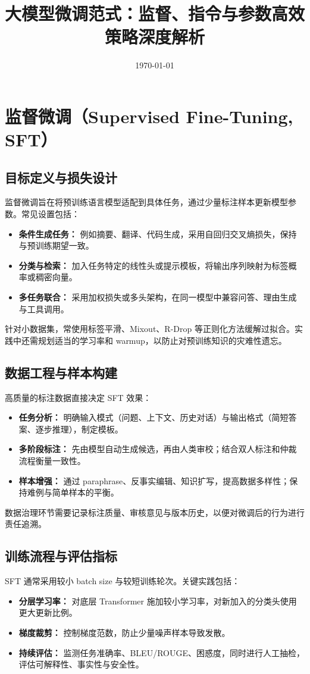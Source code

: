 \documentclass[UTF8,zihao=-4]{ctexart}
\title{大模型微调范式：监督、指令与参数高效策略深度解析}
\author{}
\date{\today}
\begin{document}
\maketitle

\section{监督微调（Supervised Fine-Tuning, SFT）}
\subsection{目标定义与损失设计}
监督微调旨在将预训练语言模型适配到具体任务，通过少量标注样本更新模型参数。常见设置包括：
\begin{itemize}
  \item \textbf{条件生成任务：} 例如摘要、翻译、代码生成，采用自回归交叉熵损失，保持与预训练期望一致。
  \item \textbf{分类与检索：} 加入任务特定的线性头或提示模板，将输出序列映射为标签概率或稠密向量。
  \item \textbf{多任务联合：} 采用加权损失或多头架构，在同一模型中兼容问答、理由生成与工具调用。
\end{itemize}
针对小数据集，常使用标签平滑、Mixout、R-Drop 等正则化方法缓解过拟合。实践中还需规划适当的学习率和 warmup，以防止对预训练知识的灾难性遗忘。

\subsection{数据工程与样本构建}
高质量的标注数据直接决定 SFT 效果：
\begin{itemize}
  \item \textbf{任务分析：} 明确输入模式（问题、上下文、历史对话）与输出格式（简短答案、逐步推理），制定模板。
  \item \textbf{多阶段标注：} 先由模型自动生成候选，再由人类审校；结合双人标注和仲裁流程衡量一致性。
  \item \textbf{样本增强：} 通过 paraphrase、反事实编辑、知识扩写，提高数据多样性；保持难例与简单样本的平衡。
\end{itemize}
数据治理环节需要记录标注质量、审核意见与版本历史，以便对微调后的行为进行责任追溯。

\subsection{训练流程与评估指标}
SFT 通常采用较小 batch size 与较短训练轮次。关键实践包括：
\begin{itemize}
  \item \textbf{分层学习率：} 对底层 Transformer 施加较小学习率，对新加入的分类头使用更大更新比例。
  \item \textbf{梯度裁剪：} 控制梯度范数，防止少量噪声样本导致发散。
  \item \textbf{持续评估：} 监测任务准确率、BLEU/ROUGE、困惑度，同时进行人工抽检，评估可解释性、事实性与安全性。
\end{itemize}
\end{document}
